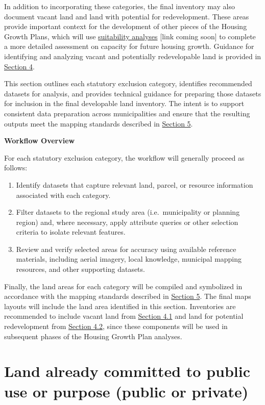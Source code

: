 \documentclass[
  letterpaper,
  DIV=11,
  numbers=noendperiod]{scrreprt}
\providecommand{\tightlist}{%
  \setlength{\itemsep}{0pt}\setlength{\parskip}{0pt}}
\begin{document}
In addition to incorporating these categories, the final inventory may
also document vacant land and land with potential for redevelopment.
These areas provide important context for the development of other
pieces of the Housing Growth Plans, which will use \ul{suitability
analyses} {[}link coming soon{]} to complete a more detailed assessment
on capacity for future housing growth. Guidance for identifying and
analyzing vacant and potentially redevelopable land is provided in
\hyperref[0]{Section 4}.

This section outlines each statutory exclusion category, identifies
recommended datasets for analysis, and provides technical guidance for
preparing those datasets for inclusion in the final developable land
inventory. The intent is to support consistent data preparation across
municipalities and ensure that the resulting outputs meet the mapping
standards described in \href{map.qmd}{Section 5}.

\textbf{Workflow Overview}

For each statutory exclusion category, the workflow will generally
proceed as follows:

\begin{enumerate}
\def\labelenumi{\arabic{enumi}.}
\tightlist
\item
  Identify datasets that capture relevant land, parcel, or resource
  information associated with each category.
\item
  Filter datasets to the regional study area (i.e.~municipality or
  planning region) and, where necessary, apply attribute queries or
  other selection criteria to isolate relevant features.
\item
  Review and verify selected areas for accuracy using available
  reference materials, including aerial imagery, local knowledge,
  municipal mapping resources, and other supporting datasets.
\end{enumerate}

Finally, the land areas for each category will be compiled and
symbolized in accordance with the mapping standards described in
\href{map.qmd}{Section 5}. The final maps layouts will include the land
area identified in this section. Inventories are recommended to include
vacant land from \href{vac_redev.qmd}{Section 4.1} and land for
potential redevelopment from \href{vac_redev.qmd}{Section 4.2}, since
these components will be used in subsequent phases of the Housing Growth
Plan analyses.

\section{Land already committed to public use or purpose (public or
private)}\label{land-already-committed-to-public-use-or-purpose-public-or-private}
\end{document}
